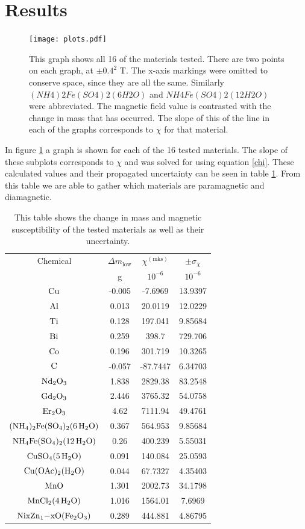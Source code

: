 \documentclass[%
 reprint,
 amsmath,amssymb,
 aps,
 10pt
]{revtex4-2}
\begin{document}
\section{Results}
\begin{figure}
	\texttt{[image: plots.pdf]}
	\caption{\label{result-fig} This graph shows all 16 of the materials tested. There are two points on each graph, at $\pm 0.4^2$ T. The x-axis markings were omitted to conserve space, since they are all the same. Similarly $(NH4)2Fe(SO4)2(6H2O)$ and $NH4Fe(SO4)2(12H2O)$ were abbreviated. The magnetic field value is contrasted with the change in mass that has occurred. The slope of this of the line in each of the graphs corresponds to $\chi$ for that material.} 
\end{figure}
In figure \ref{result-fig} a graph is shown for each of the 16 tested materials. The slope of these subplots corresponds to $\chi$ and was solved for using equation \ref{chi}. These calculated values and their propagated uncertainty can be seen in table \ref{table}. From this table we are able to gather which materials are paramagnetic and diamagnetic.
\begin{table}
\centering
	\begin{tabular}{cccc}
		\hline
		Chemical &  $\Delta m_\mathrm{low}$ & $\chi^\mathrm{(mks)}$&$\pm \sigma_{\chi}$\\
		&g&$10^{-6}$&$10^{-6}$\\
		\hline \hline

$\ce{Cu}$ & -0.005 & -7.6969 & 13.9397\\
$\ce{Al}$ & 0.013 & 20.0119 & 12.0229\\
$\ce{Ti}$ & 0.128 & 197.041 & 9.85684\\
$\ce{Bi}$ & 0.259 & 398.7 & 729.706\\
$\ce{Co}$ & 0.196 & 301.719 & 10.3265\\
$\ce{C}$ & -0.057 & -87.7447 & 6.34703\\
$\ce{Nd2O3}$ & 1.838 & 2829.38 & 83.2548\\
$\ce{Gd2O3}$ & 2.446 & 3765.32 & 54.0758\\
$\ce{Er2O3}$ & 4.62 & 7111.94 & 49.4761\\
$\ce{(NH4)2Fe(SO4)2(6H2O)}$ & 0.367 & 564.953 & 9.85684\\
$\ce{NH4Fe(SO4)2(12H2O)}$ & 0.26 & 400.239 & 5.55031\\
$\ce{CuSO4(5H2O)}$ & 0.091 & 140.084 & 25.0593\\
$\ce{Cu(OAc)2(H2O)}$ & 0.044 & 67.7327 & 4.35403\\
$\ce{MnO}$ & 1.301 & 2002.73 & 34.1798\\
$\ce{MnCl2(4H2O)}$ & 1.016 & 1564.01 & 7.6969\\
$\ce{NixZn1-xO(Fe2O3)}$ & 0.289 & 444.881 & 4.86795\\
		\hline
	\end{tabular}
	\caption{This table shows the change in mass and magnetic susceptibility of the tested materials as well as their uncertainty.}
	\label{table}
\end{table}
\end{document}
